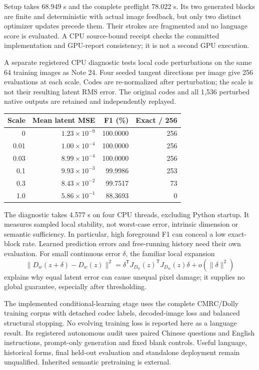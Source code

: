 \documentclass[10pt,a4paper]{article}
\begin{document}
Setup takes 68.949 s and the complete preflight 78.022 s. Its two generated
blocks are finite and deterministic with actual image feedback, but only two
distinct optimizer updates precede them. Their strokes are fragmented and no
language score is evaluated. A CPU source-bound receipt checks the committed
implementation and GPU-report consistency; it is not a second GPU execution.

A separate registered CPU diagnostic tests local code perturbations on the
same 64 training images as Note 24. Four seeded tangent directions per image
give 256 evaluations at each scale. Codes are re-normalized after perturbation;
the scale is not their resulting latent RMS error. The original codes and
all 1,536 perturbed native outputs are retained and independently replayed.
\begin{center}\small
\begin{tabular}{rrrr}\toprule
Scale & Mean latent MSE & F1 (\%) & Exact / 256\\\midrule
0 & $1.23\times10^{-9}$ & 100.0000 & 256\\
0.01 & $1.00\times10^{-4}$ & 100.0000 & 256\\
0.03 & $8.99\times10^{-4}$ & 100.0000 & 256\\
0.1 & $9.93\times10^{-3}$ & 99.9986 & 253\\
0.3 & $8.43\times10^{-2}$ & 99.7517 & 73\\
1.0 & $5.86\times10^{-1}$ & 88.3693 & 0\\\bottomrule
\end{tabular}
\end{center}
The diagnostic takes 4.577 s on four CPU threads, excluding Python startup.
It measures sampled local stability, not worst-case error, intrinsic dimension
or semantic sufficiency. In particular, high foreground F1 can conceal a low
exact-block rate. Learned prediction errors and free-running history need
their own evaluation. For small continuous error $\delta$, the familiar local
expansion
\begin{equation}
 \|D_w(z+\delta)-D_w(z)\|^2
 =\delta^{\mathsf T}J_{D_w}(z)^{\mathsf T}J_{D_w}(z)\delta
 +o(\|\delta\|^2)
\end{equation}
explains why equal latent error can cause unequal pixel damage; it supplies
no global guarantee, especially after thresholding.

The implemented conditional-learning stage uses the complete CMRC/Dolly
training corpus with detached codec labels, decoded-image loss and balanced
structural stopping. No evolving training loss is reported here as a language
result. Its registered autonomous audit uses paired Chinese questions and
English instructions, prompt-only generation and fixed blank controls.
Useful language, historical forms, final held-out evaluation and standalone
deployment remain unqualified. Inherited semantic pretraining is external.
\end{document}
